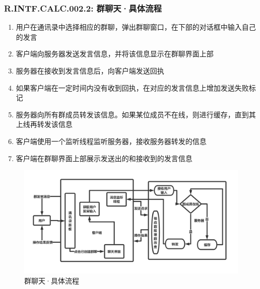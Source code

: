         \subsubsection{R.INTF.CALC.002.2: 群聊天·具体流程}
        \begin{enumerate}
            \item 用户在通讯录中选择相应的群聊，弹出群聊窗口，在下部的对话框中输入自己的发言
            \item 客户端向服务器发送发言信息，并将该信息显示在群聊界面上部
            \item 服务器在接收到发言信息后，向客户端发送回执
            \item 如果客户端在一定时间内没有收到回执，在对应的发言信息上增加发送失败标记
            \item 服务器向所有群成员转发该信息。如果某位成员不在线，则进行缓存，直到其上线再转发该信息
            \item 客户端使用一个监听线程监听服务器，接收服务器转发的信息
            \item 客户端在群聊界面上部展示发送出的和接收到的发言信息
        \end{enumerate}
        \begin{figure}[h]
            \centering
            \includegraphics[scale=0.4]{OutlineDesign/figures/群聊天·具体流程.png}
            \caption{群聊天·具体流程}
            \label{fig:server_flow}
        \end{figure}
